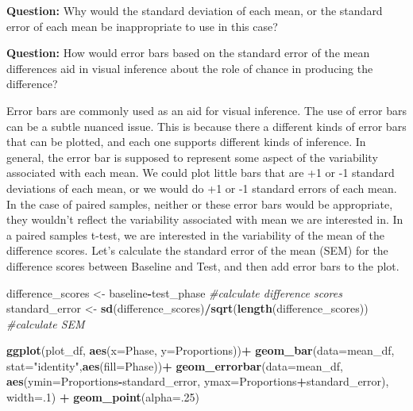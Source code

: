 \documentclass[]{book}
\newenvironment{Shaded}{\begin{snugshade}}{\end{snugshade}}
\newcommand{\KeywordTok}[1]{\textcolor[rgb]{0.13,0.29,0.53}{\textbf{#1}}}
\newcommand{\DataTypeTok}[1]{\textcolor[rgb]{0.13,0.29,0.53}{#1}}
\newcommand{\DecValTok}[1]{\textcolor[rgb]{0.00,0.00,0.81}{#1}}
\newcommand{\StringTok}[1]{\textcolor[rgb]{0.31,0.60,0.02}{#1}}
\newcommand{\CommentTok}[1]{\textcolor[rgb]{0.56,0.35,0.01}{\textit{#1}}}
\newcommand{\OperatorTok}[1]{\textcolor[rgb]{0.81,0.36,0.00}{\textbf{#1}}}
\newcommand{\NormalTok}[1]{#1}
\begin{document}
\textbf{Question:} Why would the standard deviation of each mean, or the
standard error of each mean be inappropriate to use in this case?

\textbf{Question:} How would error bars based on the standard error of
the mean differences aid in visual inference about the role of chance in
producing the difference?

Error bars are commonly used as an aid for visual inference. The use of
error bars can be a subtle nuanced issue. This is because there a
different kinds of error bars that can be plotted, and each one supports
different kinds of inference. In general, the error bar is supposed to
represent some aspect of the variability associated with each mean. We
could plot little bars that are +1 or -1 standard deviations of each
mean, or we would do +1 or -1 standard errors of each mean. In the case
of paired samples, neither or these error bars would be appropriate,
they wouldn't reflect the variability associated with mean we are
interested in. In a paired samples t-test, we are interested in the
variability of the mean of the difference scores. Let's calculate the
standard error of the mean (SEM) for the difference scores between
Baseline and Test, and then add error bars to the plot.

\begin{Shaded}
\begin{Highlighting}[]
\NormalTok{difference_scores <-}\StringTok{ }\NormalTok{baseline}\OperatorTok{-}\NormalTok{test_phase }\CommentTok{#calculate difference scores}
\NormalTok{standard_error <-}\StringTok{ }\KeywordTok{sd}\NormalTok{(difference_scores)}\OperatorTok{/}\KeywordTok{sqrt}\NormalTok{(}\KeywordTok{length}\NormalTok{(difference_scores)) }\CommentTok{#calculate SEM}


\KeywordTok{ggplot}\NormalTok{(plot_df, }\KeywordTok{aes}\NormalTok{(}\DataTypeTok{x=}\NormalTok{Phase, }\DataTypeTok{y=}\NormalTok{Proportions))}\OperatorTok{+}\StringTok{ }
\StringTok{  }\KeywordTok{geom_bar}\NormalTok{(}\DataTypeTok{data=}\NormalTok{mean_df, }\DataTypeTok{stat=}\StringTok{"identity"}\NormalTok{,}\KeywordTok{aes}\NormalTok{(}\DataTypeTok{fill=}\NormalTok{Phase))}\OperatorTok{+}
\StringTok{  }\KeywordTok{geom_errorbar}\NormalTok{(}\DataTypeTok{data=}\NormalTok{mean_df, }\KeywordTok{aes}\NormalTok{(}\DataTypeTok{ymin=}\NormalTok{Proportions}\OperatorTok{-}\NormalTok{standard_error, }
                                  \DataTypeTok{ymax=}\NormalTok{Proportions}\OperatorTok{+}\NormalTok{standard_error), }\DataTypeTok{width=}\NormalTok{.}\DecValTok{1}\NormalTok{) }\OperatorTok{+}
\StringTok{  }\KeywordTok{geom_point}\NormalTok{(}\DataTypeTok{alpha=}\NormalTok{.}\DecValTok{25}\NormalTok{)}
\end{Highlighting}
\end{Shaded}
\end{document}
